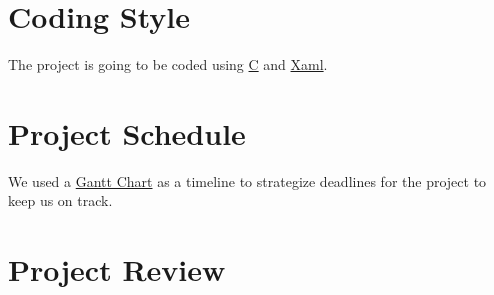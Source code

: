 \documentclass{article}
\begin{document}
\section{Coding Style}
The project is going to be coded using \href{https://users.ece.cmu.edu/~eno/coding/CCodingStandard.html}{C} and \href{https://github.com/cmaneu/xaml-coding-guidelines/blob/master/README.mdl}{Xaml}.

\section{Project Schedule}
We used a \href{run:../../ProjectSchedule/3X_Example.gann}{Gantt Chart} as a timeline to strategize deadlines for the project to keep us on track. 

\section{Project Review}
\end{document}
